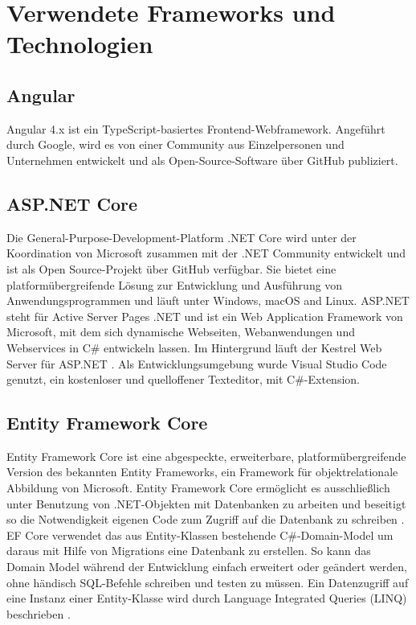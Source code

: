\section{Verwendete Frameworks und Technologien}


\subsection{Angular}

Angular 4.x \cite{angular} ist ein TypeScript-basiertes Frontend-Webframework. Angeführt durch Google, wird es von einer Community aus Einzelpersonen und Unternehmen entwickelt und als Open-Source-Software über GitHub \cite{angularGit} publiziert.


\subsection{ASP.NET Core}

Die General-Purpose-Development-Platform .NET Core wird unter der Koordination von Microsoft zusammen mit der .NET Community entwickelt und ist als Open Source-Projekt über GitHub \cite{dotnetcore} verfügbar. Sie bietet eine platformübergreifende Lösung zur Entwicklung und Ausführung von Anwendungsprogrammen und läuft unter Windows, macOS and Linux. ASP.NET steht für Active Server Pages .NET und ist ein Web Application Framework von Microsoft, mit dem sich dynamische Webseiten, Webanwendungen und Webservices in C\# entwickeln lassen. Im Hintergrund läuft der Kestrel Web Server für ASP.NET \cite{kestrel}. Als Entwicklungsumgebung wurde Visual Studio Code genutzt, ein kostenloser und quelloffener Texteditor, mit C\#-Extension.


\subsection{Entity Framework Core}

Entity Framework Core ist eine abgespeckte, erweiterbare, platformübergreifende Version des bekannten Entity Frameworks, ein Framework für objektrelationale Abbildung von Microsoft. Entity Framework Core ermöglicht es ausschließlich unter Benutzung von .NET-Objekten mit Datenbanken zu arbeiten und beseitigt so die Notwendigkeit eigenen Code zum Zugriff auf die Datenbank zu schreiben \cite{msentitiyframework}. EF Core verwendet das aus Entity-Klassen bestehende C\#-Domain-Model um daraus mit Hilfe von Migrations eine Datenbank zu erstellen. So kann das Domain Model während der Entwicklung einfach erweitert oder geändert werden, ohne händisch SQL-Befehle schreiben und testen zu müssen. Ein Datenzugriff auf eine Instanz einer Entity-Klasse wird durch Language Integrated Queries (LINQ) beschrieben \cite{dotnetcore}.


